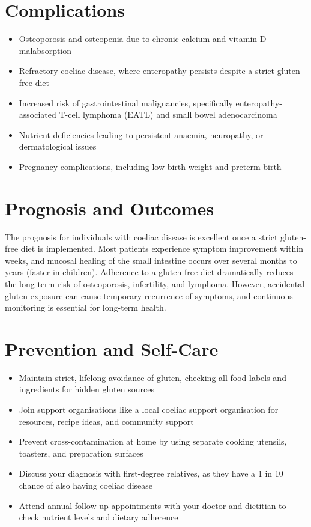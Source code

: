 \section*{Complications}
\begin{itemize}
    \item Osteoporosis and osteopenia due to chronic calcium and vitamin D malabsorption
    \item Refractory coeliac disease, where enteropathy persists despite a strict gluten-free diet
    \item Increased risk of gastrointestinal malignancies, specifically enteropathy-associated T-cell lymphoma (EATL) and small bowel adenocarcinoma
    \item Nutrient deficiencies leading to persistent anaemia, neuropathy, or dermatological issues
    \item Pregnancy complications, including low birth weight and preterm birth
\end{itemize}

\section*{Prognosis and Outcomes}
The prognosis for individuals with coeliac disease is excellent once a strict gluten-free diet is implemented. Most patients experience symptom improvement within weeks, and mucosal healing of the small intestine occurs over several months to years (faster in children). Adherence to a gluten-free diet dramatically reduces the long-term risk of osteoporosis, infertility, and lymphoma. However, accidental gluten exposure can cause temporary recurrence of symptoms, and continuous monitoring is essential for long-term health.

\section*{Prevention and Self-Care}
\begin{itemize}
    \item Maintain strict, lifelong avoidance of gluten, checking all food labels and ingredients for hidden gluten sources
    \item Join support organisations like a local coeliac support organisation for resources, recipe ideas, and community support
    \item Prevent cross-contamination at home by using separate cooking utensils, toasters, and preparation surfaces
    \item Discuss your diagnosis with first-degree relatives, as they have a 1 in 10 chance of also having coeliac disease
    \item Attend annual follow-up appointments with your doctor and dietitian to check nutrient levels and dietary adherence
\end{itemize}

